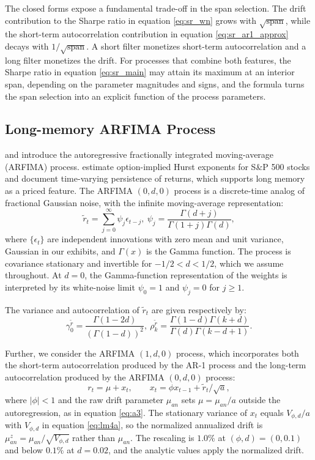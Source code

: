 \documentclass[hidelinks]{siamonline250211}
\newcommand{\spn}{\mathrm{span}}
\begin{document}
The closed forms expose a fundamental trade-off in the span selection. The drift contribution to the Sharpe ratio in equation \eqref{eq:sr_wn} grows with $\sqrt{\spn}$, while the short-term autocorrelation contribution in equation \eqref{eq:sr_ar1_approx} decays with $1/\sqrt{\spn}$. A short filter monetizes short-term autocorrelation and a long filter monetizes the drift. For processes that combine both features, the Sharpe ratio in equation \eqref{eq:sr_main} may attain its maximum at an interior span, depending on the parameter magnitudes and signs, and the formula turns the span selection into an explicit function of the process parameters.


\subsection{Long-memory ARFIMA Process}

\cite{Granger1980} and \cite{Hosking1981} introduce the autoregressive fractionally integrated moving-average (ARFIMA) process. \citet{SchadnerLang2023} estimate option-implied Hurst exponents for S\&P 500 stocks and document time-varying persistence of returns, which supports long memory as a priced feature. The ARFIMA $(0,d,0)$ process is a discrete-time analog of fractional Gaussian noise, with the infinite moving-average representation:
\begin{equation} \label{eq:lm1} 
	\tilde{r}_{t} =   \sum^{\infty}_{j=0}\psi_{j}\epsilon_{t-j}, \ \psi_{j} = \frac{\Gamma(d+j)}{\Gamma(1+j)\Gamma(d)},
\end{equation}
where $\{\epsilon_{t}\}$ are independent innovations with zero mean and unit variance, Gaussian in our exhibits, and $\Gamma(x)$ is the Gamma function. The process is covariance stationary and invertible for $-1/2 < d < 1/2$, which we assume throughout. At $d=0$, the Gamma-function representation of the weights is interpreted by its white-noise limit $\psi_{0}=1$ and $\psi_{j}=0$ for $j \geq 1$.

The variance and autocorrelation of $\tilde{r}_{t}$ are given respectively by:
\begin{equation} \label{eq:lm3} 
	\gamma^{\tilde{r}}_{0} = \frac{\Gamma(1-2d)}{(\Gamma(1-d))^{2}}, \ \rho^{\tilde{r}}_{k} = \frac{\Gamma(1-d)\Gamma(k+d)}{\Gamma(d)\Gamma(k-d+1)}.
\end{equation}


Further, we consider the ARFIMA $(1,d,0)$ process, which incorporates both the short-term autocorrelation produced by the AR-1 process and the long-term autocorrelation produced by the ARFIMA $(0,d,0)$ process:
\begin{equation} \label{eq:lm2} 
	r_{t} = \mu + x_{t}, \qquad x_{t} = \phi x_{t-1} + \tilde{r}_{t}/\sqrt{a},
\end{equation}
where $|\phi|<1$ and the raw drift parameter $\mu_{an}$ sets $\mu=\mu_{an}/a$ outside the autoregression, as in equation \eqref{eq:a3}. The stationary variance of $x_{t}$ equals $V_{\phi,d}/a$ with $V_{\phi,d}$ in equation \eqref{eq:lm4a}, so the normalized annualized drift is $\mu^{z}_{an} = \mu_{an}/\sqrt{V_{\phi,d}}$ rather than $\mu_{an}$. The rescaling is $1.0\%$ at $(\phi, d)=(0, 0.1)$ and below $0.1\%$ at $d=0.02$, and the analytic values apply the normalized drift.
\end{document}
